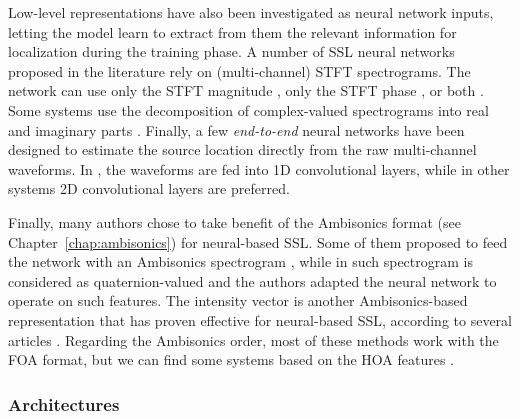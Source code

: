 Low-level representations have also been investigated as neural network inputs, letting the model learn to extract from them the relevant information for localization during the training phase. A number of SSL neural networks proposed in the literature rely on (multi-channel) STFT spectrograms. The network can use only the STFT magnitude \cite{yalta_sound_2017, pertila_robust_2017}, only the STFT phase \cite{subramanian_deep_2021, zhang_robust_2019}, or both \cite{guirguis_seld-tcn_2021, krause_comparison_2021, maruri_gcc-phat_2019, schymura_pilot_2021}. Some systems use the decomposition of complex-valued spectrograms into real and imaginary parts \cite{he_joint_2018, moing_learning_2020}. Finally, a few \textit{end-to-end} neural networks have been designed to estimate the source location directly from the raw multi-channel waveforms. In \cite{suvorov_deep_2018}, the waveforms are fed into 1D convolutional layers, while in other systems \cite{vera-diaz_towards_2018, vecchiotti_end--end_2019, pujol_beamlearning_2021} 2D convolutional layers are preferred.

Finally, many authors chose to take benefit of the Ambisonics format (see Chapter~\ref{chap:ambisonics}) for neural-based SSL. Some of them proposed to feed the network with an Ambisonics spectrogram \cite{adavanne_localization_2019, guirguis_seld-tcn_2021, schymura_exploiting_2021}, while in \cite{comminiello_quaternion_2019} such spectrogram is considered as quaternion-valued and the authors adapted the neural network to operate on such features. The intensity vector is another Ambisonics-based representation that has proven effective for neural-based SSL, according to several articles \cite{perotin_crnn-based_2018, perotin_crnn-based_2019, nguyen_general_2021}. Regarding the Ambisonics order, most of these methods work with the FOA format, but we can find some systems based on the HOA features \cite{varanasi_deep_2020,poschadel_direction_2021}.

\subsubsection{Architectures}

